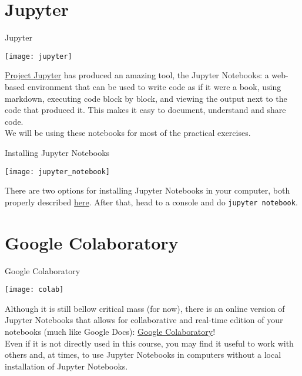 \documentclass[aspectratio=43]{beamer}
\begin{document}
\section{Jupyter}
\begin{frame}{Jupyter}
    \begin{center}
	    \texttt{[image: jupyter]}
	\end{center}
	\begin{cardTiny}
	    \href{http://jupyter.org/}{Project Jupyter} has produced an amazing tool, the Jupyter Notebooks: a web-based environment that can be used to write code as if it were a book, using markdown, executing code block by block, and viewing the output next to the code that produced it. This makes it easy to document, understand and share code.\\
	    We will be using these notebooks for most of the practical exercises.
	\end{cardTiny}
\pagenumber
\end{frame}

\begin{frame}{Installing Jupyter Notebooks}
    \begin{center}
	    \texttt{[image: jupyter\_notebook]}
	\end{center}
    \begin{cardTiny}
        \small{
        There are two options for installing Jupyter Notebooks in your computer, both properly described \href{http://jupyter.org/install.html}{here}. After that, head to a console and do \texttt{jupyter notebook}. 
        }
    \end{cardTiny}
\pagenumber
\end{frame}

\section{Google Colaboratory}
\begin{frame}{Google Colaboratory}
    \begin{center}
	    \texttt{[image: colab]}
    \end{center}
    \begin{cardTiny}
        Although it is still bellow critical mass (for now), there is an online version of Jupyter Notebooks that allows for collaborative and real-time edition of your notebooks (much like Google Docs): \href{https://colab.research.google.com/}{Google Colaboratory}!\\
        Even if it is not directly used in this course, you may find it useful to work with others and, at times, to use Jupyter Notebooks in computers without a local installation of Jupyter Notebooks.
    \end{cardTiny}
\pagenumber
\end{frame}
\end{document}
